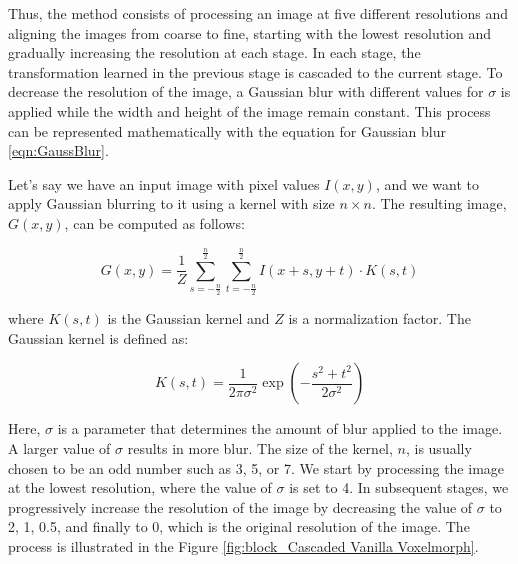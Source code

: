 \documentclass{book}
\begin{document}
	Thus, the method consists of processing an image at five different resolutions and aligning the images from coarse to fine, starting with the lowest resolution and gradually increasing the resolution at each stage. In each stage, the transformation learned in the previous stage is cascaded to the current stage. To decrease the resolution of the image, a Gaussian blur with different values for $\sigma$ is applied while the width and height of the image remain constant. This process can be represented mathematically with the equation for Gaussian blur \ref{eqn:GaussBlur}.
	
	Let's say we have an input image with pixel values $I(x, y)$, and we want to apply Gaussian blurring to it using a kernel with size $n \times n$. The resulting image, $G(x, y)$, can be computed as follows:
	
	\begin{equation}\label{eqn:GaussBlur}
		G(x, y) = \frac{1}{Z} \sum_{s=-\frac{n}{2}}^{\frac{n}{2}}\sum_{t=-\frac{n}{2}}^{\frac{n}{2}}I(x+s, y+t) \cdot K(s, t)
	\end{equation}
	
	where $K(s, t)$ is the Gaussian kernel and $Z$ is a normalization factor. The Gaussian kernel is defined as:
	
	\begin{equation}
		K(s, t) = \frac{1}{2\pi \sigma^2} \exp\left(-\frac{s^2+t^2}{2\sigma^2}\right)
	\end{equation}
	
	Here, $\sigma$ is a parameter that determines the amount of blur applied to the image. A larger value of $\sigma$ results in more blur. The size of the kernel, $n$, is usually chosen to be an odd number such as 3, 5, or 7. We start by processing the image at the lowest resolution, where the value of $\sigma$ is set to 4. In subsequent stages, we progressively increase the resolution of the image by decreasing the value of $\sigma$ to 2, 1, 0.5, and finally to 0, which is the original resolution of the image.
	The process is illustrated in the Figure \ref{fig:block_Cascaded Vanilla Voxelmorph}.
	
\end{document}
